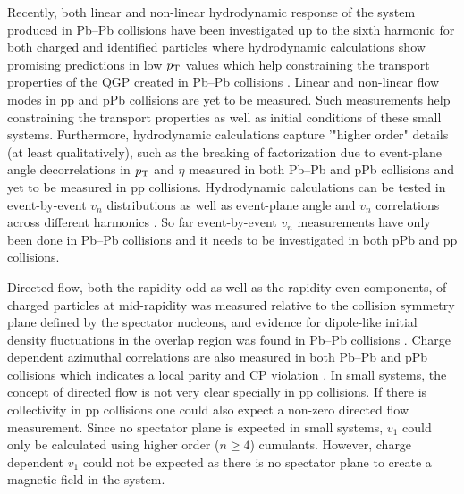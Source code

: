 \documentclass[../report.tex]{subfiles}
\begin{document}
Recently, both linear and non-linear hydrodynamic response of the system produced in Pb--Pb collisions have been investigated up to the sixth harmonic for both charged and identified particles where hydrodynamic calculations show promising predictions in low $p_{\rm{T}}$ values which help constraining the transport properties of the QGP created in Pb--Pb collisions \cite{Acharya:2017zfg}. Linear and non-linear flow modes in pp and pPb collisions are yet to be measured. Such measurements help constraining the transport properties as well as initial conditions of these small systems. Furthermore, hydrodynamic calculations capture '"higher order" details (at least qualitatively), such as the breaking of factorization due to event-plane angle decorrelations in $p_{\rm{T}}$ and $\eta$ measured in both Pb--Pb and pPb collisions \cite{Khachatryan:2015oea,Sirunyan:2017gyb,Acharya:2017ino} and yet to be measured in pp collisions. Hydrodynamic calculations can be tested in event-by-event $v_{n}$ distributions as well as event-plane angle and $v_{n}$ correlations across different harmonics \cite{Aad:2014fla,Aad:2015lwa,ALICE:2016kpq,Sirunyan:2017uyl}. So far event-by-event $v_{n}$ measurements have only been done in Pb--Pb collisions \cite{Aad:2013xma,Sirunyan:2017fts} and it needs to be investigated in both pPb and pp collisions. 

Directed flow, both the rapidity-odd as well as the rapidity-even components, of charged particles at mid-rapidity was measured relative to the collision symmetry plane defined by the spectator nucleons, and evidence for dipole-like initial density fluctuations in the overlap region was found in Pb--Pb collisions \cite{Abelev:2013cva}. Charge dependent azimuthal correlations are also measured in both Pb--Pb and pPb collisions which indicates a local parity and CP violation \cite{Adam:2015vje,Sirunyan:2017tax,Acharya:2017fau,Sirunyan:2017quh,Khachatryan:2016got}. In small systems, the concept of directed flow is not very clear specially in pp collisions. If there is collectivity in pp collisions one could also expect a non-zero directed flow measurement. Since no spectator plane is expected in small systems, $v_{1}$ could only be calculated using higher order ($n\geq 4$) cumulants. However, charge dependent $v_{1}$ could not be expected as there is no spectator plane to create a magnetic field in the system. 
\end{document}
